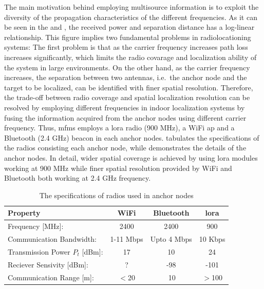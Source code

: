     The main motivation behind employing multisource information is to exploit the diversity of the propagation characteristics of the different frequencies.
    As it can be seen in the  and , the received power and separation distance has a log-linear relationship.
    This figure implies two fundamental problems in radiolocationing systems:
    The first problem is that as the carrier frequency increases path loss increases significantly, which limits the radio covarage and localization ability of the system in large environments.
    On the other hand, as the carrier frequency increases, the separation between two antennas, i.e.\ the anchor node and the target to be localized, can be identified with finer spatial resolution.
    Therefore, the trade-off between radio coverage and spatial localization resolution can be resolved by employing different frequencies in indoor localization systems by fusing the information acquired from the anchor nodes using different carrier frequency.
    Thus, \gls{mfms} employs a \gls{lora} radio (900 MHz), a WiFi \gls{ap} and a Bluetooth (2.4 GHz) beacon in each anchor nodes.
     tabulates the specifications of the radios consisting each anchor node, while  demonstrates the details of the anchor nodes.
    In detail, wider spatial coverage is achieved by using \gls{lora} modules working at 900 MHz while finer spatial resolution provided by WiFi and Bluetooth both working at 2.4 GHz frequency.

    \begin{table}
    \begin{center}
    \caption{\label{tab:specs}The specifications of radios used in anchor nodes}
      \begin{tabular}{@{}lccc@{}}\toprule[1.5pt]
        Property                        &WiFi           &Bluetooth      &\gls{lora}\\ \midrule[1.5pt]
        Frequency [MHz]:                &2400           &2400           &900 \\ \midrule
        Communication Bandwidth:        &1-11 Mbps      &Upto 4 Mbps    &10 Kbps \\ \midrule
        Transmission Power $P_t$ [dBm]: &17             &10             &24 \\ \midrule
        Reciever Sensivity [dBm]:       &?              &-98            &-101 \\ \midrule
        Communication Range [m]:        &$<$20          &$~$10            &$>$100  \\\bottomrule[1.5pt]
      \end{tabular}
    \end{center}
    \end{table}

